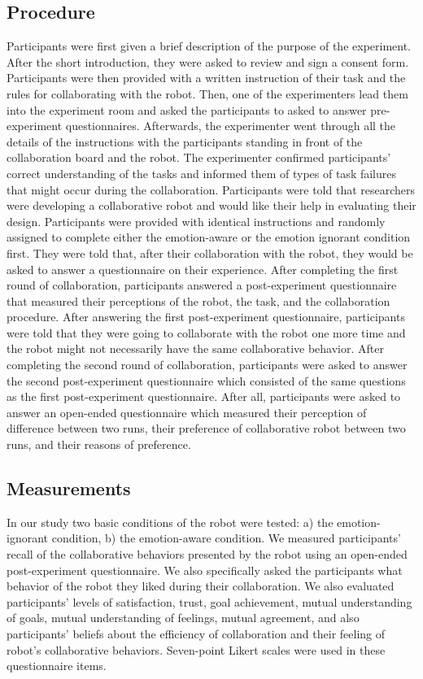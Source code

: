 \documentclass[12pt]{report}
\begin{document}
\subsection{Procedure}
\label{sec:procedure}
Participants were first given a brief description of the purpose of the
experiment. After the short introduction, they were asked to review and sign a
consent form. Participants were then provided with a written instruction of
their task and the rules for collaborating with the robot. Then, one of the
experimenters lead them into the experiment room and asked the participants
to asked to answer pre-experiment questionnaires. Afterwards, the experimenter
went through all the details of the instructions with the participants
standing in front of the collaboration board and the robot. The experimenter
confirmed participants' correct understanding of the tasks and informed them
of types of task failures that might occur during the collaboration.
Participants were told that researchers were developing a collaborative robot
and would like their help in evaluating their design. Participants were provided
with identical instructions and randomly assigned to complete either the
emotion-aware or the emotion ignorant condition first. They were told that,
after their collaboration with the robot, they would be asked to answer a
questionnaire on their experience. After completing the first round of
collaboration, participants answered a post-experiment questionnaire that
measured their perceptions of the robot, the task, and the collaboration
procedure. After answering the first post-experiment questionnaire, participants
were told that they were going to collaborate with the robot one more time and
the robot might not necessarily have the same collaborative behavior. After
completing the second round of collaboration, participants were asked to answer
the second post-experiment questionnaire which consisted of the same questions
as the first post-experiment questionnaire. After all, participants were asked
to answer an open-ended questionnaire which measured their perception of
difference between two runs, their preference of collaborative robot between two
runs, and their reasons of preference.

\subsection{Measurements}
\label{sec:Measurements}
In our study two basic conditions of the robot were tested: a) the
emotion-ignorant condition, b) the emotion-aware condition. We measured
participants' recall of the collaborative behaviors presented by the robot using
an open-ended post-experiment questionnaire. We also specifically asked the
participants what behavior of the robot they liked during their collaboration.
We also evaluated participants' levels of satisfaction, trust, goal achievement,
mutual understanding of goals, mutual understanding of feelings, mutual
agreement, and also participants' beliefs about the efficiency of collaboration
and their feeling of robot's collaborative behaviors. Seven-point Likert scales
were used in these questionnaire items.
\end{document}
